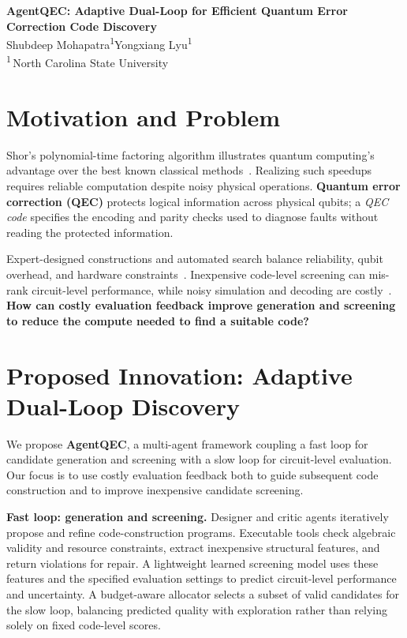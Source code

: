 \documentclass[11pt]{article}
\newcommand{\projecttitle}{AgentQEC: Adaptive Dual-Loop for Efficient Quantum Error Correction Code Discovery}
\newcommand{\studentA}{Shubdeep Mohapatra}
\newcommand{\studentB}{Yongxiang Lyu}
\newcommand{\university}{North Carolina State University}
\begin{document}
\begingroup\centering
    {\Large\bfseries \projecttitle}\\[2pt]
    {\small \studentA\textsuperscript{1}\qquad \studentB\textsuperscript{1}}\\[1pt]
    {\small \textsuperscript{1}\,\university}
\par\endgroup
\vspace{2pt}

\section*{Motivation and Problem}
Shor's polynomial-time factoring algorithm illustrates quantum computing's advantage over the best known classical methods~\cite{shor}. Realizing such speedups requires reliable computation despite noisy physical operations. \textbf{Quantum error correction (QEC)} protects logical information across physical qubits; a \emph{QEC code} specifies the encoding and parity checks used to diagnose faults without reading the protected information.

Expert-designed constructions and automated search balance reliability, qubit overhead, and hardware constraints~\cite{olle}. Inexpensive code-level screening can mis-rank circuit-level performance, while noisy simulation and decoding are costly~\cite{omniqec}. \textbf{How can costly evaluation feedback improve generation and screening to reduce the compute needed to find a suitable code?}

\section*{Proposed Innovation: Adaptive Dual-Loop Discovery}
We propose \textbf{AgentQEC}, a multi-agent framework coupling a fast loop for candidate generation and screening with a slow loop for circuit-level evaluation. Our focus is to use costly evaluation feedback both to guide subsequent code construction and to improve inexpensive candidate screening.

\textbf{Fast loop: generation and screening.} Designer and critic agents iteratively propose and refine code-construction programs. Executable tools check algebraic validity and resource constraints, extract inexpensive structural features, and return violations for repair. A lightweight learned screening model uses these features and the specified evaluation settings to predict circuit-level performance and uncertainty. A budget-aware allocator selects a subset of valid candidates for the slow loop, balancing predicted quality with exploration rather than relying solely on fixed code-level scores.
\end{document}
